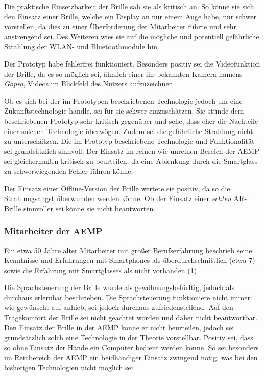 Die praktische Einsetzbarkeit der Brille sah sie als kritisch an. So könne sie sich den Einsatz einer Brille, welche ein Display an nur einem Auge habe, nur schwer vorstellen, da dies zu einer Überforderung der Mitarbeiter führte und sehr anstrengend sei. Des Weiteren wies sie auf die mögliche und potentiell gefährliche Strahlung der WLAN- und Bluetoothmodule hin.

Der Prototyp habe fehlerfrei funktioniert. Besonders positiv sei die Videofunktion der Brille, da es so möglich sei, ähnlich einer ihr bekannten Kamera namens \emph{Gopro}, Videos im Blickfeld des Nutzers aufzuzeichnen. 

Ob es sich bei der im Prototypen beschriebenen Technologie jedoch um eine Zukunftstechnologie handle, sei für sie schwer einzuschätzen. Sie stünde dem beschriebenen Prototyp sehr kritisch gegenüber und sehe, dass eher die Nachteile einer solchen Technologie überwögen. Zudem sei die gefährliche Strahlung nicht zu unterschätzen. Die im Prototyp beschriebene Technologie und Funktionalität sei grundsätzlich sinnvoll. Der Einsatz im reinen wie unreinen Bereich der AEMP sei gleichermaßen kritisch zu beurteilen, da eine Ablenkung durch die Smartglass zu schwerwiegenden Fehler führen könne.

Der Einsatz einer Offline-Version der Brille wertete sie positiv, da so die Strahlungsangst überwunden werden könne. Ob der Einsatz einer \emph{echten} AR-Brille sinnvoller sei könne sie nicht beantworten.
%
%
\subsubsection{Mitarbeiter der AEMP}
%
Ein etwa 50 Jahre alter Mitarbeiter mit großer Berufserfahrung beschrieb seine Kenntnisse und Erfahrungen mit Smartphones als überdurchschnittlich (etwa 7) sowie die Erfahrung mit Smartglasses als nicht vorhanden (1).

Die Sprachsteuerung der Brille wurde als gewöhnungsbefürftig, jedoch als durchaus erlernbar beschrieben. Die Sprachsteuerung funktioniere nicht immer wie gewünscht auf anhieb, sei jedoch durchaus zufriedenstellend. Auf den Tragekomfort der Brille sei nicht geachtet worden und daher nicht beantwortbar. Den Einsatz der Brille in der AEMP könne er nicht beurteilen, jedoch sei grundsätzlich solch eine Technologie in der Theorie vorstellbar. Positiv sei, dass so ohne Einsatz der Hände ein Computer bedient werden könne. So sei besonders im Reinbereich der AEMP ein beidhändiger Einsatz zwingend nötig, was bei den bisherigen Technologien nicht möglich sei. 

